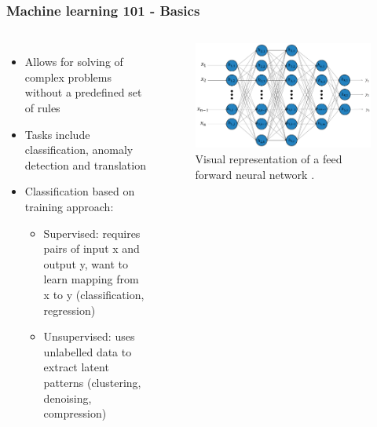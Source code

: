 \documentclass[10pt, presentation]{beamer}
\begin{document}
    \begin{frame}
        \frametitle{Machine learning 101 - Basics}
        \begin{columns}
            \begin{itemize}
                \item Allows for solving of complex problems without a predefined set of rules \cite{Goodfellow-et-al-2016}
                \item Tasks include classification, anomaly detection and translation
                \item Classification based on training approach:
                \begin{itemize}
                    \item Supervised: requires pairs of input x and output y, want to learn mapping from x to y  (classification, regression)
                    \item Unsupervised: uses unlabelled data to extract latent patterns (clustering, denoising, compression)
                \end{itemize}
            \end{itemize}
            \begin{figure}
                \centerline{\includegraphics[scale=0.06,keepaspectratio]{figures/ann.jpg}}
                \caption{Visual representation of a feed forward neural network \cite{article:18}.}
            \end{figure}
        \end{columns}
    \end{frame}
\end{document}
